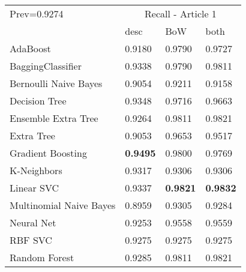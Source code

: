 \begin{tabular}{|l|l|l|l| }
\hline
Prev=0.9274 &  \multicolumn{3}{c|}{Recall - Article 1} \\
\cline{2-4} & desc & BoW & both \\ \hline
AdaBoost                & 0.9180 & 0.9790 & 0.9727\\
BaggingClassifier       & 0.9338 & 0.9790 & 0.9811\\
Bernoulli Naive Bayes   & 0.9054 & 0.9211 & 0.9158\\
Decision Tree           & 0.9348 & 0.9716 & 0.9663\\
Ensemble Extra Tree     & 0.9264 & 0.9811 & 0.9821\\
Extra Tree              & 0.9053 & 0.9653 & 0.9517\\
Gradient Boosting       & {\bf 0.9495} & 0.9800 & 0.9769\\
K-Neighbors             & 0.9317 & 0.9306 & 0.9306\\
Linear SVC              & 0.9337 & {\bf 0.9821} & {\bf 0.9832}\\
Multinomial Naive Bayes & 0.8959 & 0.9305 & 0.9284\\
Neural Net              & 0.9253 & 0.9558 & 0.9559\\
RBF SVC                 & 0.9275 & 0.9275 & 0.9275\\
Random Forest           & 0.9285 & 0.9811 & 0.9821\\
\hline
\end{tabular}